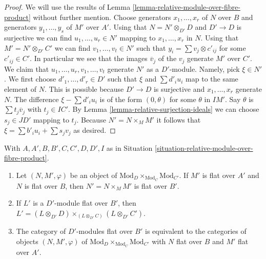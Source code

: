 \begin{proof}
We will use the results of
Lemma \ref{lemma-relative-module-over-fibre-product}
without further mention. Choose generators $x_1, \ldots, x_r$ of $N$ over $B$
and generators $y_1, \ldots, y_s$ of $M'$ over $A'$. Using that
$N = N' \otimes_{D'} D$ and $D' \to D$ is surjective we can find
$u_1, \ldots, u_r \in N'$ mapping to $x_1, \ldots, x_r$ in $N$.
Using that $M' = N' \otimes_{D'} C'$ we can find $v_1, \ldots, v_t \in N'$
such that $y_i = \sum v_j \otimes c'_{ij}$ for some $c'_{ij} \in C'$.
In particular we see that the images $\overline{v}_j$ of the $v_j$ generate
$M'$ over $C'$. We claim that $u_1, \ldots, u_r, v_1, \ldots, v_t$
generate $N'$ as a $D'$-module. Namely, pick $\xi \in N'$. We first choose
$d'_1, \ldots, d'_r \in D'$ such that $\xi$ and $\sum d'_i u_i$ map
to the same element of $N$. This is possible because $D' \to D$
is surjective and $x_1, \ldots, x_r$ generate $N$.
The difference $\xi - \sum d'_i u_i$ is of the form $(0, \theta)$
for some $\theta$ in $IM'$. Say $\theta$ is $\sum t_j\overline{v}_j$
with $t_j \in IC'$. By Lemma \ref{lemma-relative-surjection-ideals}
we can choose $s_j \in JD'$ mapping to $t_j$.
Because $N' = N \times_M M'$ it follows
that $\xi = \sum b'_i u_i + \sum s_j v_j$ as desired.
\end{proof}

\begin{lemma}
\label{lemma-relative-flat-module-over-fibre-product}
With $A, A', B, B', C, C', D, D', I$ as in
Situation \ref{situation-relative-module-over-fibre-product}.
\begin{enumerate}
\item Let $(N, M', \varphi)$ be an object of
$\text{Mod}_D \times_{\text{Mod}_C} \text{Mod}_{C'}$.
If $M'$ is flat over $A'$ and $N$ is flat over $B$, then
$N' = N \times_M M'$ is flat over $B'$.
\item If $L'$ is a $D'$-module flat over $B'$, then
$L' = (L \otimes_{D'} D) \times_{(L \otimes_{D'} C)} (L \otimes_{D'} C')$.
\item The category of $D'$-modules flat over $B'$
is equivalent to the categories of objects $(N, M', \varphi)$
of $\text{Mod}_D \times_{\text{Mod}_C} \text{Mod}_{C'}$
with $N$ flat over $B$ and $M'$ flat over $A'$.
\end{enumerate}
\end{lemma}

